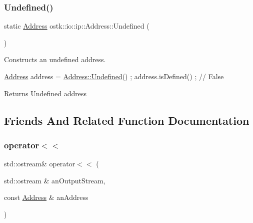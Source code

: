 \subsubsection{\texorpdfstring{Undefined()}{Undefined()}}
{\footnotesize\ttfamily static \hyperlink{classostk_1_1io_1_1ip_1_1_address}{Address} ostk\+::io\+::ip\+::\+Address\+::\+Undefined (\begin{DoxyParamCaption}{ }\end{DoxyParamCaption})\hspace{0.3cm}{\ttfamily [static]}}



Constructs an undefined address. 


\begin{DoxyCode}
\hyperlink{classostk_1_1io_1_1ip_1_1_address_a4118f42388b11fb003c9fb782f4ca04f}{Address} address = \hyperlink{classostk_1_1io_1_1ip_1_1_address_a3e429f06ca69746fb73c155a8a4857b7}{Address::Undefined}() ;
address.isDefined() ; \textcolor{comment}{// False}
\end{DoxyCode}


\begin{DoxyReturn}{Returns}
Undefined address 
\end{DoxyReturn}


\subsection{Friends And Related Function Documentation}
\mbox{\label{classostk_1_1io_1_1ip_1_1_address_acb0766764bb037acde8e0acdfdecadd0}} 
\subsubsection{\texorpdfstring{operator$<$$<$}{operator<<}}
{\footnotesize\ttfamily std\+::ostream\& operator$<$$<$ (\begin{DoxyParamCaption}\item[{std\+::ostream \&}]{an\+Output\+Stream,  }\item[{const \hyperlink{classostk_1_1io_1_1ip_1_1_address}{Address} \&}]{an\+Address }\end{DoxyParamCaption})\hspace{0.3cm}{\ttfamily [friend]}}



